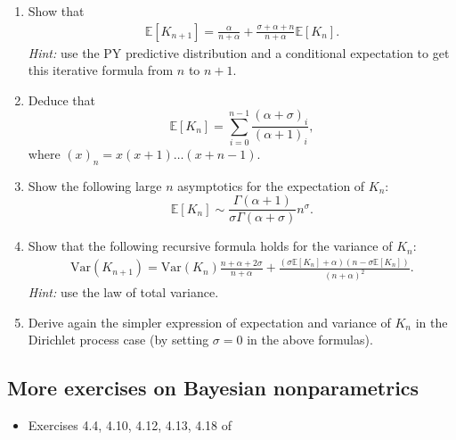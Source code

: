 \documentclass{article}
\def\E{\mathbb{E}}
\def\Var{\mbox{Var}}
\begin{document}
\begin{enumerate}
	\item Show that 
\begin{align*}
    \E[K_{n+1}]= \frac{\alpha}{n+\alpha} + \frac{\sigma + \alpha +n}{n+ \alpha}\E\left[K_n\right].
\end{align*}
\textit{Hint:} use the PY predictive distribution and a conditional expectation to get this iterative formula from $n$ to $n+1$.  
	\item Deduce that
\begin{equation*}
        \E[K_n] = \sum_{i=0}^{n-1} \frac{(\alpha +\sigma)_{i}}{(\alpha + 1)_{i}},
\end{equation*}
where $(x)_n = x(x+1)\ldots(x+n-1)$.
	\item Show the following large $n$ asymptotics for the expectation of $K_n$:
\begin{equation*}
        \E[K_n] \sim \frac{\Gamma(\alpha+1)}{\sigma \Gamma(\alpha+\sigma)}n^\sigma.
\end{equation*}
\item Show that the following recursive formula holds for the variance of $K_n$:
\begin{align}
\Var(K_{n+1}) = \Var(K_n)\frac{n + \alpha + 2\sigma}{n+\alpha} + \frac{(\sigma\E[K_n]+ \alpha)(n - \sigma\E[K_n])}{(n+\alpha)^2}.
\end{align} 
\textit{Hint:} use the law of total variance.
\item Derive again the simpler expression of expectation and variance of $K_n$ in the Dirichlet process case (by setting $\sigma = 0$ in the above formulas).
\end{enumerate}

\subsection*{More exercises on Bayesian nonparametrics}

\begin{itemize}
	\item Exercises 4.4, 4.10, 4.12, 4.13, 4.18 of 
\end{itemize}
\end{document}
